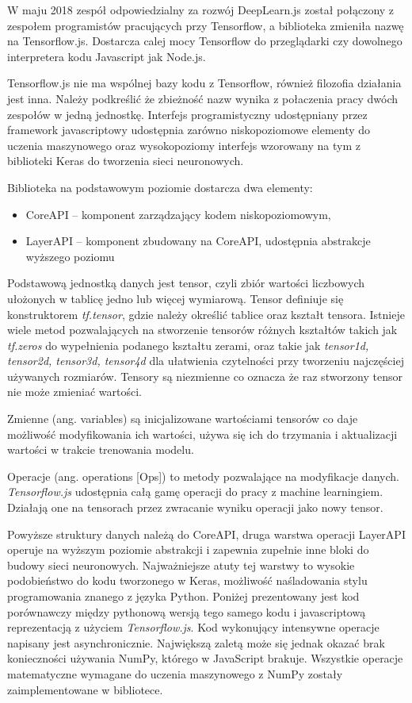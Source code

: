 \documentclass[12pt,a4paper,twoside,titlepage,openright]{book}
\begin{document}
W maju 2018 zespół odpowiedzialny za rozwój DeepLearn.js został połączony z zespołem programistów pracujących przy Tensorflow, a biblioteka zmieniła nazwę na Tensorflow.js. Dostarcza calej mocy Tensorflow do przeglądarki czy dowolnego interpretera kodu Javascript jak Node.js.

Tensorflow.js nie ma wspólnej bazy kodu z Tensorflow, również filozofia działania jest inna. Należy podkreślić że zbieżność nazw wynika z połaczenia pracy dwóch zespołów w jedną jednostkę. Interfejs programistyczny udostępniany przez framework javascriptowy udostępnia zarówno niskopoziomowe elementy do uczenia maszynowego oraz wysokopoziomy interfejs wzorowany na tym z biblioteki Keras do tworzenia sieci neuronowych.

Biblioteka na podstawowym poziomie dostarcza dwa elementy:
\begin{itemize}
\item CoreAPI -- komponent zarządzający kodem niskopoziomowym,
\item LayerAPI -- komponent zbudowany na CoreAPI, udostępnia abstrakcje wyższego poziomu
\end{itemize}

Podstawową jednostką danych jest tensor, czyli zbiór wartości liczbowych ułożonych w tablicę jedno lub więcej wymiarową. Tensor definiuje się konstruktorem \textit{tf.tensor}, gdzie należy określić tablice oraz kształt tensora. Istnieje wiele metod pozwalających na stworzenie tensorów różnych kształtów takich jak \textit{tf.zeros} do wypełnienia podanego kształtu zerami, oraz takie jak \textit{tensor1d, tensor2d, tensor3d, tensor4d} dla ułatwienia czytelności przy tworzeniu najczęściej używanych rozmiarów.
Tensory są niezmienne co oznacza że raz stworzony tensor nie może zmieniać wartości. 

Zmienne (ang. variables) są inicjalizowane wartościami tensorów co daje możliwość modyfikowania ich wartości, używa się ich do trzymania i aktualizacji wartości w trakcie trenowania modelu.

Operacje (ang. operations [Ops]) to metody pozwalające na modyfikacje danych. \textit{Tensorflow.js} udostępnia całą gamę operacji do pracy z machine learningiem. Działają one na tensorach przez zwracanie wyniku operacji jako nowy tensor.

Powyższe struktury danych należą do CoreAPI, druga warstwa operacji LayerAPI operuje na wyższym poziomie abstrakcji i zapewnia zupełnie inne bloki do budowy sieci neuronowych. Najważniejsze atuty tej warstwy to wysokie podobieństwo do kodu tworzonego w Keras, możliwość naśladowania stylu programowania znanego z języka Python. Poniżej prezentowany jest kod porównawczy między pythonową wersją tego samego kodu i javascriptową reprezentacją z użyciem \textit{Tensorflow.js}. Kod wykonujący intensywne operacje napisany jest asynchronicznie. Największą zaletą może się jednak okazać brak konieczności używania NumPy, którego w JavaScript brakuje. Wszystkie operacje matematyczne wymagane do uczenia maszynowego z NumPy zostały zaimplementowane w bibliotece. \cite{siteTensorflowJSConcepts}
\end{document}
